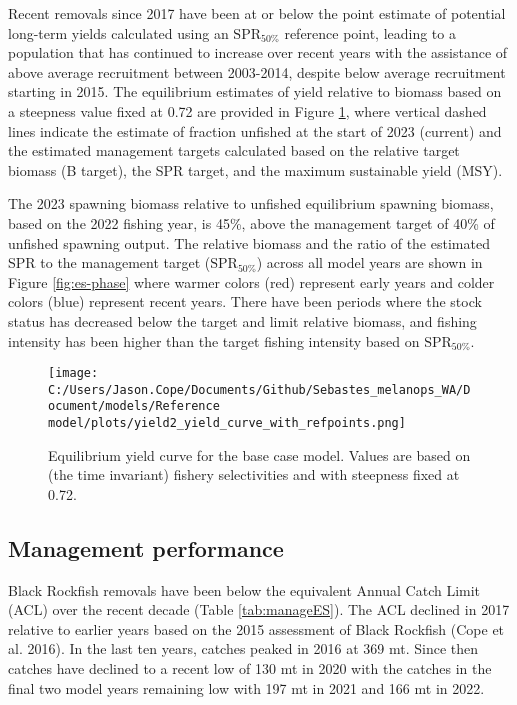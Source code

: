 \documentclass[11pt,
  english,
  letterpaper,
]{article}
\begin{document}
Recent removals since 2017 have been at or below the point estimate of potential long-term yields calculated using an \(\text{SPR}_{50\%}\) reference point, leading to a population that has continued to increase over recent years with the assistance of above average recruitment between 2003-2014, despite below average recruitment starting in 2015. The equilibrium estimates of yield relative to biomass based on a steepness value fixed at 0.72 are provided in Figure \ref{fig:es-yield}, where vertical dashed lines indicate the estimate of fraction unfished at the start of 2023 (current) and the estimated management targets calculated based on the relative target biomass (B target), the SPR target, and the maximum sustainable yield (MSY).

The 2023 spawning biomass relative to unfished equilibrium spawning biomass, based on the 2022 fishing year, is 45\%, above the management target of 40\% of unfished spawning output. The relative biomass and the ratio of the estimated SPR to the management target (\(\text{SPR}_{50\%}\)) across all model years are shown in Figure \ref{fig:es-phase} where warmer colors (red) represent early years and colder colors (blue) represent recent years. There have been periods where the stock status has decreased below the target and limit relative biomass, and fishing intensity has been higher than the target fishing intensity based on \(\text{SPR}_{50\%}\).

\begin{figure}
\centering
\texttt{[image: C:/Users/Jason.Cope/Documents/Github/Sebastes\_melanops\_WA/Document/models/Reference model/plots/yield2\_yield\_curve\_with\_refpoints.png]}
\caption{Equilibrium yield curve for the base case model. Values are based on (the time invariant) fishery selectivities and with steepness fixed at 0.72.\label{fig:es-yield}}
\end{figure}

\clearpage



\clearpage

\hypertarget{management-performance}{%
\subsection*{Management performance}\label{management-performance}}

Black Rockfish removals have been below the equivalent Annual Catch Limit (ACL) over the recent decade (Table \ref{tab:manageES}). The ACL declined in 2017 relative to earlier years based on the 2015 assessment of Black Rockfish (Cope et al. 2016). In the last ten years, catches peaked in 2016 at 369 mt. Since then catches have declined to a recent low of 130 mt in 2020 with the catches in the final two model years remaining low with 197 mt in 2021 and 166 mt in 2022.
\end{document}
